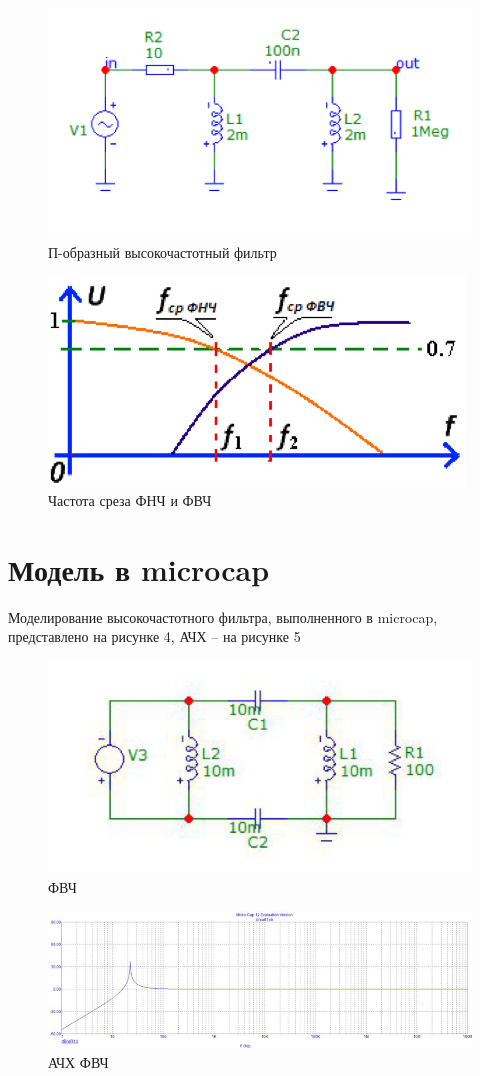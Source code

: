 \begin{figure}[H]
	\centering
	\includegraphics[width=0.7\linewidth]{img/f2}
	\caption{П-образный высокочастотный фильтр}
\end{figure}

\begin{figure}[H]
	\centering
	\includegraphics[width=0.7\linewidth]{img/f3}
	\caption{Частота среза ФНЧ и ФВЧ}
\end{figure}

\section{Модель в microcap}

Моделирование высокочастотного фильтра, выполненного в microcap, представлено на рисунке 4, АЧХ – на рисунке 5

\begin{figure}[H]
	\centering
	\includegraphics[width=0.7\linewidth]{img/f4}
	\caption{ФВЧ}
\end{figure}

\begin{figure}[H]
	\centering
	\includegraphics[width=0.7\linewidth]{img/f5}
	\caption{АЧХ ФВЧ}
\end{figure}

